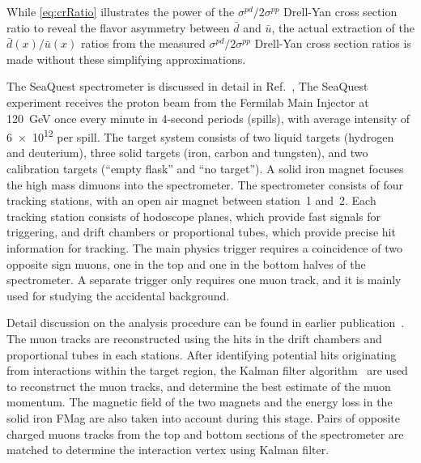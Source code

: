 \documentclass[reprint,aps,unsortedaddress,superscriptaddress,prl,floatfix,showpacs,linenumbers,final]{revtex4-2}
\begin{document}
While \cref{eq:crRatio} illustrates the power of the $\sigma^{pd}/2\sigma^{pp}$ Drell-Yan cross section
ratio to reveal the flavor asymmetry between $\bar{d}$ and $\bar{u}$,
the actual extraction of the $\bar{d}\left(x\right) / \bar{u}\left(x\right)$
ratios from the measured $\sigma^{pd}/ 2 \sigma^{pp}$ Drell-Yan cross
section ratios is made without these simplifying approximations.

The SeaQuest spectrometer is  discussed in detail in Ref.~\cite{aidala2019},
The SeaQuest experiment receives the  proton beam from the Fermilab Main
Injector at \SI{120}{\GeV}
once every minute in 4-second periods (spills), with average intensity
of \num{6e12} per spill.
The target system consists of two liquid targets (hydrogen and deuterium),
three solid targets (iron, carbon and tungsten), and two calibration
targets (``empty flask'' and ``no target'').
A solid iron magnet focuses the high mass dimuons into the spectrometer.
The spectrometer consists of four tracking stations, with an open
air magnet between station~1 and~2.
Each tracking station consists of hodoscope planes, which
provide fast signals for triggering,
and drift chambers or proportional tubes, which provide precise
hit information for tracking.
The main physics trigger requires a coincidence of two opposite sign muons,
one in the top and one in the bottom halves of the spectrometer.
A separate trigger only requires one muon track, and it is mainly used
for studying the accidental background.

Detail discussion on the analysis procedure can be found in earlier publication~\cite{dove2021,dove2023}.
The muon tracks are reconstructed using the hits in the drift chambers and proportional tubes in each stations.
After identifying potential hits originating from interactions within the target region,
the Kalman filter algorithm~\cite{kalman1960} are used to reconstruct the muon tracks,
and determine the best estimate of the muon momentum.
The magnetic field of the two magnets and the energy loss in the solid iron FMag are also taken into account during this stage.
Pairs of opposite charged muons tracks from the top and bottom sections of the spectrometer are
matched to determine the interaction vertex using Kalman filter.
\end{document}
